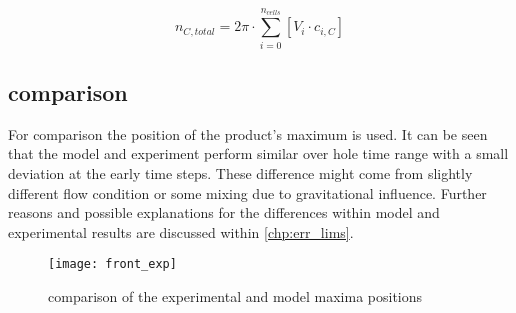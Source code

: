 \documentclass[../thesis.tex]{subfiles}
\begin{document}
\begin{equation}
	n_{C, total} = 2 \pi \cdot \sum_{i=0}^{n_{cells}} \left[ V_i \cdot c_{i, C} \right]
	\label{eqn: tot_prod} 
\end{equation}

\subsection{comparison}

For comparison the position of the product's maximum is used. It can be seen that the model and experiment perform similar over hole time range with a small deviation at the early time steps. These difference might come from slightly different flow condition or some mixing due to gravitational influence. Further reasons and possible explanations for the differences within model and experimental results are discussed within \autoref{chp:err_lims}.

\begin{figure}[htbp]
	\centering
	\texttt{[image: front\_exp]}
	\caption{comparison of the experimental and model maxima positions}
	\label{fig: comp_maxis}
\end{figure}
    
\end{document}
